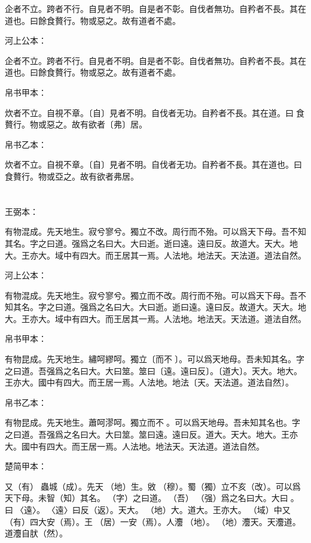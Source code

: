 \documentclass[a5paper]{ctexbook}
\begin{document}
    企者不立。跨者不行。自見者不明。自是者不彰。自伐者無功。自矜者不長。其在道也。曰餘食贅行。物或惡之。故有道者不處。

    河上公本：

    企者不立。跨者不行。自見者不明。自是者不彰。自伐者無功。自矜者不長。其在道也。曰餘食贅行。物或惡之。故有道者不處。

    帛书甲本：

    炊者不立。自視不章。〔自〕見者不明。自伐者无功。自矜者不長。其在道。曰𥺌食贅行。物或惡之。故有欲者〔弗〕居。

    帛书乙本：

    炊者不立。自視不章。〔自〕見者不明。自伐者无功。自矜者不長。其在道也。曰𥺌食贅行。物或亞之。故有欲者弗居。

    \chapter{}
    王弼本：

    有物混成。先天地生。寂兮寥兮。獨立不改。周行而不殆。可以爲天下母。吾不知其名。字之曰道。强爲之名曰大。大曰逝。逝曰遠。遠曰反。故道大。天大。地大。王亦大。域中有四大。而王居其一焉。人法地。地法天。天法道。道法自然。

    河上公本：

    有物混成。先天地生。寂兮寥兮。獨立而不改。周行而不殆。可以爲天下母。吾不知其名。字之曰道。强爲之名曰大。大曰逝。逝曰遠。遠曰反。故道大。天大。地大。王亦大。域中有四大。而王居其一焉。人法地。地法天。天法道。道法自然。

    帛书甲本：

    有物昆成。先天地生。繡呵繆呵。獨立〔而不󱁡〕。可以爲天地母。吾未知其名。字之曰道。吾强爲之名曰大。大曰筮。筮曰〔遠。遠曰反〕。〔道大〕。天大。地大。王亦大。國中有四大。而王居一焉。人法地。地法〔天。天法道。道法自然〕。

    帛书乙本：

    有物昆成。先天地生。蕭呵漻呵。獨立而不󱁡。可以爲天地母。吾未知其名也。字之曰道。吾强爲之名曰大。大曰筮。筮曰遠。遠曰反。道大。天大。地大。王亦大。國中有四大。而王居一焉。人法地。地法天。天法道。道法自然。

    楚简甲本：

    又（有）󶴷蟲城（成）。先天󶴵（地）生。敓󶴸（穆）。蜀（獨）立不亥（改）。可以爲天下母。未智（知）其名。󼼐（字）之曰道。󼾲（吾）󶴔（强）爲之名曰大。大曰󶴹。󶴹曰󶴿〈遠〉。󶴿〈遠〉曰反（返）。天大。󶴵（地）大。道大。王亦大。󶴺（域）中又（有）四大安（焉）。王󶵀（居）一安（焉）。人灋󶴵（地）。󶴵（地）灋天。天灋道。道灋自肰（然）。
\end{document}
